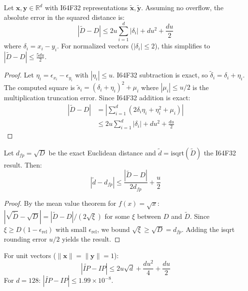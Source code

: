 \documentclass[10pt,journal,compsoc]{IEEEtran}
\begin{document}
\begin{theorem}
\label{thm:sq_dist_error}
Let $\mathbf{x}, \mathbf{y} \in \mathbb{R}^d$ with I64F32 representations $\tilde{\mathbf{x}}, \tilde{\mathbf{y}}$. Assuming no overflow, the absolute error in the squared distance is:
\begin{equation}
  |\tilde{D} - D| \leq 2u\sum_{i=1}^{d}|\delta_i| + du^2 + \frac{du}{2}
\end{equation}
where $\delta_i = x_i - y_i$. For normalized vectors ($|\delta_i| \leq 2$), this simplifies to $|\tilde{D} - D| \leq \frac{5du}{2}$.
\end{theorem}

\begin{proof}
Let $\eta_i = \epsilon_{x_i} - \epsilon_{y_i}$ with $|\eta_i| \leq u$. I64F32 subtraction is exact, so $\tilde{\delta}_i = \delta_i + \eta_i$. The computed square is $\tilde{s}_i = (\delta_i + \eta_i)^2 + \mu_i$ where $|\mu_i| \leq u/2$ is the multiplication truncation error. Since I64F32 addition is exact:
\begin{align}
  |\tilde{D} - D| &= \left|\sum_{i=1}^{d}(2\delta_i\eta_i + \eta_i^2 + \mu_i)\right| \\
  &\leq 2u\sum_{i=1}^{d}|\delta_i| + du^2 + \frac{du}{2}
\end{align}
\end{proof}

\begin{theorem}
\label{thm:eucl_dist_error}
Let $d_{fp} = \sqrt{D}$ be the exact Euclidean distance and $\tilde{d} = \mathrm{isqrt}(\tilde{D})$ the I64F32 result. Then:
\begin{equation}
  |\tilde{d} - d_{fp}| \leq \frac{|\tilde{D} - D|}{2d_{fp}} + \frac{u}{2}
\end{equation}
\end{theorem}

\begin{proof}
By the mean value theorem for $f(x) = \sqrt{x}$: $|\sqrt{\tilde{D}} - \sqrt{D}| = |\tilde{D} - D| / (2\sqrt{\xi})$ for some $\xi$ between $D$ and $\tilde{D}$. Since $\xi \geq D(1 - \epsilon_{\text{rel}})$ with small $\epsilon_{\text{rel}}$, we bound $\sqrt{\xi} \geq \sqrt{D} = d_{fp}$. Adding the isqrt rounding error $u/2$ yields the result.
\end{proof}

\begin{theorem}
\label{thm:ip_error}
For unit vectors ($\|\mathbf{x}\| = \|\mathbf{y}\| = 1$):
\begin{equation}
  |\widetilde{IP} - IP| \leq 2u\sqrt{d} + \frac{du^2}{4} + \frac{du}{2}
\end{equation}
For $d = 128$: $|\widetilde{IP} - IP| \leq 1.99 \times 10^{-8}$.
\end{theorem}
\end{document}
